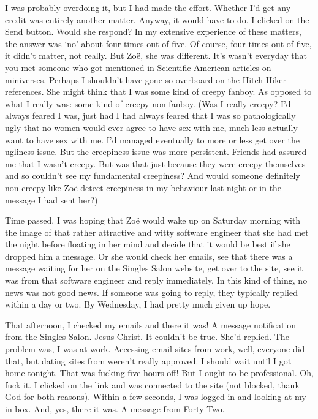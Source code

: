I was probably overdoing it, but I had made the effort. Whether I'd
get any credit was entirely another matter. Anyway, it would have to
do. I clicked on the Send button. Would she respond? In my extensive
experience of these matters, the answer was `no' about four times
out of five. Of course, four times out of five, it didn't matter,
not really. But Zo{\"e}, she was different. It's wasn't everyday
that you met someone who got mentioned in {\twelvesl Scientific
American\/} articles on miniverses. Perhaps I shouldn't have gone so
overboard on the {\twelvesl Hitch-Hiker\/} references. She might
think that I was some kind of creepy fanboy. As opposed to what I
really was: some kind of creepy non-fanboy. (Was I really creepy?
I'd always feared I was, just had I had always feared that I was so
pathologically ugly that no women would ever agree to have sex with
me, much less actually {\twelveit want\/} to have sex with me. I'd
managed eventually to more or less get over the ugliness issue. But
the creepiness issue was more persistent. Friends had assured me
that I wasn't creepy. But was that just because they were creepy
themselves and so couldn't see my fundamental creepiness? And would
someone definitely non-creepy like Zo{\"e} detect creepiness in my
behaviour last night or in the message I had sent her?)

Time passed. I was hoping that Zo{\"e} would wake up on Saturday
morning with the image of that rather attractive and witty software
engineer that she had met the night before floating in her mind and
decide that it would be best if she dropped him a message. Or she
would check her emails, see that there was a message waiting for her
on the Singles Salon website, get over to the site, see it was from
that software engineer and reply immediately. In this kind of thing,
no news was not good news. If someone was going to reply, they
typically replied within a day or two. By Wednesday, I had pretty
much given up hope.

That afternoon, I checked my emails and there it was! A message
notification from the Singles Salon. Jesus Christ. It couldn't be
true. She'd replied. The problem was, I was at work. Accessing email
sites from work, well, everyone did that, but dating sites from
weren't really approved. I should wait until I got home tonight.
That was fucking five hours off! But I ought to be professional. Oh,
fuck it. I clicked on the link and was connected to the site (not
blocked, thank God for both reasons). Within a few seconds, I was
logged in and looking at my in-box. And, yes, there it was. A
message from Forty-Two.

